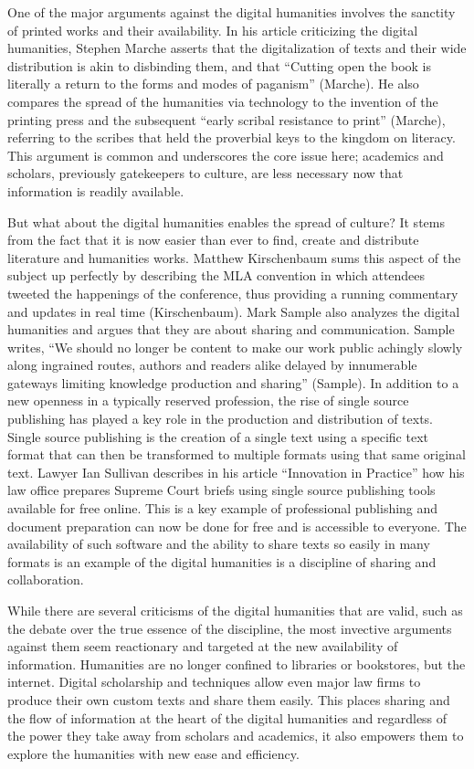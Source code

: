 \documentclass[]{article}
\begin{document}
One of the major arguments against the digital humanities involves the
sanctity of printed works and their availability. In his article
criticizing the digital humanities, Stephen Marche asserts that the
digitalization of texts and their wide distribution is akin to
disbinding them, and that ``Cutting open the book is literally a return
to the forms and modes of paganism'' (Marche). He also compares the
spread of the humanities via technology to the invention of the printing
press and the subsequent ``early scribal resistance to print'' (Marche),
referring to the scribes that held the proverbial keys to the kingdom on
literacy. This argument is common and underscores the core issue here;
academics and scholars, previously gatekeepers to culture, are less
necessary now that information is readily available.

But what about the digital humanities enables the spread of culture? It
stems from the fact that it is now easier than ever to find, create and
distribute literature and humanities works. Matthew Kirschenbaum sums
this aspect of the subject up perfectly by describing the MLA convention
in which attendees tweeted the happenings of the conference, thus
providing a running commentary and updates in real time (Kirschenbaum).
Mark Sample also analyzes the digital humanities and argues that they
are about sharing and communication. Sample writes, ``We should no
longer be content to make our work public achingly slowly along
ingrained routes, authors and readers alike delayed by innumerable
gateways limiting knowledge production and sharing'' (Sample). In
addition to a new openness in a typically reserved profession, the rise
of single source publishing has played a key role in the production and
distribution of texts. Single source publishing is the creation of a
single text using a specific text format that can then be transformed to
multiple formats using that same original text. Lawyer Ian Sullivan
describes in his article ``Innovation in Practice'' how his law office
prepares Supreme Court briefs using single source publishing tools
available for free online. This is a key example of professional
publishing and document preparation can now be done for free and is
accessible to everyone. The availability of such software and the
ability to share texts so easily in many formats is an example of the
digital humanities is a discipline of sharing and collaboration.

While there are several criticisms of the digital humanities that are
valid, such as the debate over the true essence of the discipline, the
most invective arguments against them seem reactionary and targeted at
the new availability of information. Humanities are no longer confined
to libraries or bookstores, but the internet. Digital scholarship and
techniques allow even major law firms to produce their own custom texts
and share them easily. This places sharing and the flow of information
at the heart of the digital humanities and regardless of the power they
take away from scholars and academics, it also empowers them to explore
the humanities with new ease and efficiency.
\end{document}
